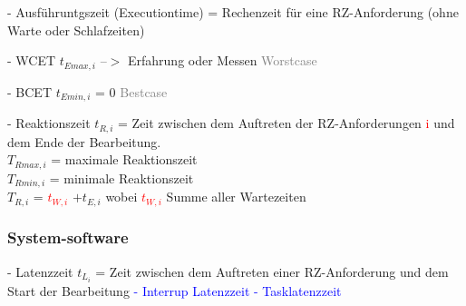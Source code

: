 \documentclass[12pt,a4paper,oneside,ngerman]{article}
\begin{document}
\begin{description}
\item - Ausführuntgszeit (Executiontime) = Rechenzeit für eine RZ-Anforderung (ohne Warte oder Schlafzeiten)	
	\begin{description}
		\item - WCET \(t_{Emax,i}\) --$>$ Erfahrung oder Messen \textcolor{gray}{Worstcase}
		\item - BCET \(t_{Emin,i}\) = 0 \textcolor{gray}{Bestcase}
	\end{description}
\end{description}


- Reaktionszeit \(t_{R,i}\) = Zeit zwischen dem Auftreten der RZ-Anforderungen \textcolor{red}{i} und dem Ende der Bearbeitung. \\

\(T_{Rmax,i}\) = maximale Reaktionszeit \\
\(T_{Rmin,i}\) = minimale Reaktionszeit \\
\(T_{R,i}\) = \textcolor{red}{\(t_{W,i}\)} \(+ t_{E,i}\) wobei \textcolor{red}{ \(t_{W,i}\) } Summe aller Wartezeiten

\subsubsection{System-software}

- Latenzzeit \(t_{L_i}\) = Zeit zwischen dem Auftreten einer RZ-Anforderung und dem Start der Bearbeitung
\textcolor{blue}{
	- Interrup Latenzzeit
	- Tasklatenzzeit
}
\end{document}
